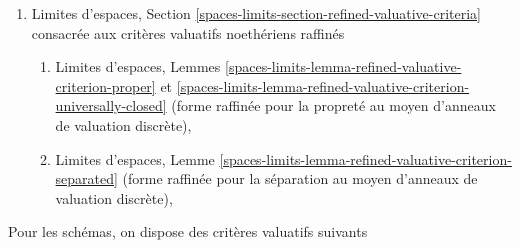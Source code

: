 \begin{enumerate}
\begin{enumerate}
(pour la propreté au moyen d'anneaux de valuation discrète et de points génériques),
\item Limites d'espaces, Lemme
\ref{spaces-limits-lemma-check-universally-closed-Noetherian}
(pour le caractère universellement fermé au moyen d'anneaux de valuation discrète).
\end{enumerate}
\item Limites d'espaces, Section
\ref{spaces-limits-section-refined-valuative-criteria}
consacrée aux critères valuatifs noethériens raffinés
\begin{enumerate}
\item Limites d'espaces, Lemmes
\ref{spaces-limits-lemma-refined-valuative-criterion-proper} et
\ref{spaces-limits-lemma-refined-valuative-criterion-universally-closed}
(forme raffinée pour la propreté au moyen d'anneaux de valuation discrète),
\item Limites d'espaces, Lemme
\ref{spaces-limits-lemma-refined-valuative-criterion-separated}
(forme raffinée pour la séparation au moyen d'anneaux de valuation discrète),
\end{enumerate}
\end{enumerate}
Pour les schémas, on dispose des critères valuatifs suivants
